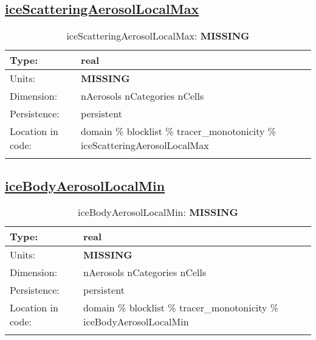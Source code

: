 \subsection[iceScatteringAerosolLocalMax]{\hyperref[sec:var_tab_tracer_monotonicity]{iceScatteringAerosolLocalMax}}
\label{subsec:var_sec_tracer_monotonicity_iceScatteringAerosolLocalMax}
\begin{center}
\begin{longtable}{| p{2.0in} | p{4.0in} |}
        \hline 
        Type: & real \\
        \hline 
        Units: & {\bf \color{red} MISSING} \\
        \hline 
        Dimension: & nAerosols nCategories nCells \\
        \hline 
        Persistence: & persistent \\
        \hline 
         Location in code: & domain \% blocklist \% tracer\_monotonicity \% iceScatteringAerosolLocalMax \\
         \hline 
    \caption{iceScatteringAerosolLocalMax: {\bf \color{red} MISSING}}
\end{longtable}
\end{center}
\subsection[iceBodyAerosolLocalMin]{\hyperref[sec:var_tab_tracer_monotonicity]{iceBodyAerosolLocalMin}}
\label{subsec:var_sec_tracer_monotonicity_iceBodyAerosolLocalMin}
\begin{center}
\begin{longtable}{| p{2.0in} | p{4.0in} |}
        \hline 
        Type: & real \\
        \hline 
        Units: & {\bf \color{red} MISSING} \\
        \hline 
        Dimension: & nAerosols nCategories nCells \\
        \hline 
        Persistence: & persistent \\
        \hline 
         Location in code: & domain \% blocklist \% tracer\_monotonicity \% iceBodyAerosolLocalMin \\
         \hline 
    \caption{iceBodyAerosolLocalMin: {\bf \color{red} MISSING}}
\end{longtable}
\end{center}

